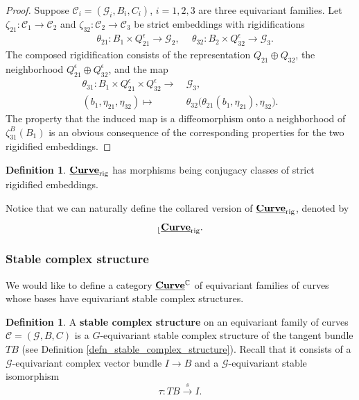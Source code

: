 \documentclass[reqno, 10pt]{amsart}
\numberwithin{equation}{section}
\numberwithin{equation}{section}
\theoremstyle{definition}
\newtheorem{defn}[thm]{Definition}
\theoremstyle{remark}
\newcommand{\beqn}{\begin{equation*}}
\newcommand{\eeqn}{\end{equation*}}
\newcommand{\mb}{\mathbb}
\newcommand{\mc}{\mathcal}
\renewcommand{\outer}{{}_{\lfloor}}
\newcommand{\uds}[1]{\underline{\smash{#1}}}
\begin{document}
\begin{proof}
Suppose ${\mc C}_i = ({\mc G}_i, B_i, C_i)$, $i = 1, 2, 3$ are three equivariant families. Let $\zeta_{21}: {\mc C}_1 \to {\mc C}_2$ and $\zeta_{32}: {\mc C}_2 \to {\mc C}_3$ be strict embeddings with rigidifications 
\begin{align*}
&\ \theta_{21}: B_1\times Q_{21}^\epsilon \to {\mc G}_2,\ &\  \theta_{32}: B_2 \times Q_{32}^\epsilon \to {\mc G}_3.
\end{align*}
The composed rigidification consists of the representation $Q_{21} \oplus Q_{32}$, the neighborhood $Q_{21}^\epsilon \oplus Q_{32}^\epsilon$, and the map 
\beqn
\begin{split}
\theta_{31}: B_1 \times Q_{21}^\epsilon \times Q_{32}^\epsilon \to &\ {\mc G}_3,\\
(b_1, \eta_{21}, \eta_{32}) \mapsto &\ \theta_{32} \Big( \theta_{21}(b_1, \eta_{21}), \eta_{32} \Big).
\end{split}
\eeqn
The property that the induced map is a diffeomorphism onto a neighborhood of $\zeta_{31}^B(B_1)$ is an obvious consequence of the corresponding properties for the two rigidified embeddings.
\end{proof}

\begin{defn}
$\uds{\bf Curve}_{\rm rig}$ has morphisms being conjugacy classes of strict rigidified embeddings.
\end{defn}

Notice that we can naturally define the collared version of $\uds{\bf Curve}_{\rm rig}$, denoted by 
\beqn
\outer \uds{\bf Curve}_{\rm rig}.
\eeqn

\subsubsection{Stable complex structure}

We would like to define a category $\uds{\bf Curve}^{\mb C}$ of equivariant families of curves whose bases have equivariant stable complex structures. 

\begin{defn}
A {\bf stable complex structure} on an equivariant family of curves ${\mc C} = ({\mc G}, B, C)$ is a $G$-equivariant stable complex structure of the tangent bundle $TB$ (see Definition \ref{defn_stable_complex_structure}). Recall that it consists of a ${\mc G}$-equivariant complex vector bundle $I \to B$ and a ${\mc G}$-equivariant stable isomorphism
    \beqn
    \tau: TB \overset{s}{\to} I.
    \eeqn
\end{defn}
\end{document}

